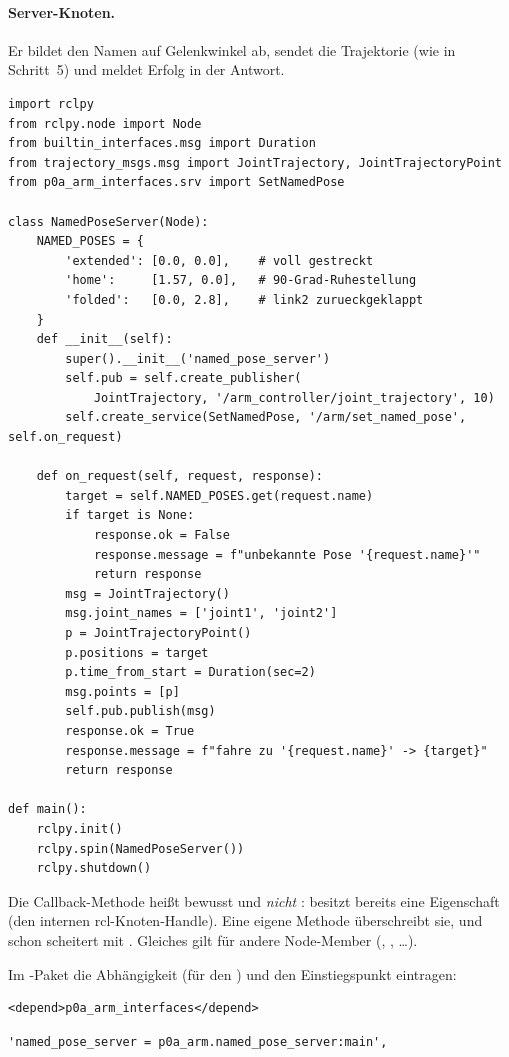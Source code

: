 \paragraph{Server-Knoten.} Er bildet den Namen auf Gelenkwinkel ab, sendet die
Trajektorie (wie in Schritt~5) und meldet Erfolg in der Antwort.
\begin{lstlisting}[style=py,caption={\code{p0a\_arm/named\_pose\_server.py}}]
import rclpy
from rclpy.node import Node
from builtin_interfaces.msg import Duration
from trajectory_msgs.msg import JointTrajectory, JointTrajectoryPoint
from p0a_arm_interfaces.srv import SetNamedPose

class NamedPoseServer(Node):
    NAMED_POSES = {
        'extended': [0.0, 0.0],    # voll gestreckt
        'home':     [1.57, 0.0],   # 90-Grad-Ruhestellung
        'folded':   [0.0, 2.8],    # link2 zurueckgeklappt
    }
    def __init__(self):
        super().__init__('named_pose_server')
        self.pub = self.create_publisher(
            JointTrajectory, '/arm_controller/joint_trajectory', 10)
        self.create_service(SetNamedPose, '/arm/set_named_pose', self.on_request)

    def on_request(self, request, response):
        target = self.NAMED_POSES.get(request.name)
        if target is None:
            response.ok = False
            response.message = f"unbekannte Pose '{request.name}'"
            return response
        msg = JointTrajectory()
        msg.joint_names = ['joint1', 'joint2']
        p = JointTrajectoryPoint()
        p.positions = target
        p.time_from_start = Duration(sec=2)
        msg.points = [p]
        self.pub.publish(msg)
        response.ok = True
        response.message = f"fahre zu '{request.name}' -> {target}"
        return response

def main():
    rclpy.init()
    rclpy.spin(NamedPoseServer())
    rclpy.shutdown()
\end{lstlisting}
\begin{warnbox}[title={Callback nicht \code{handle} nennen}]
Die Callback-Methode heißt bewusst  und \emph{nicht}
:  besitzt bereits eine Eigenschaft
 (den internen rcl-Knoten-Handle). Eine eigene Methode 
überschreibt sie, und schon  scheitert mit
. Gleiches
gilt für andere Node-Member (, , \ldots).
\end{warnbox}
\noindent Im -Paket die Abhängigkeit (für den ) und
den Einstiegspunkt eintragen:
\begin{lstlisting}[style=xml,caption={\code{p0a\_arm/package.xml}}]
<depend>p0a_arm_interfaces</depend>
\end{lstlisting}
\begin{lstlisting}[style=py,caption={\code{p0a\_arm/setup.py} -- \code{entry\_points}}]
'named_pose_server = p0a_arm.named_pose_server:main',
\end{lstlisting}

